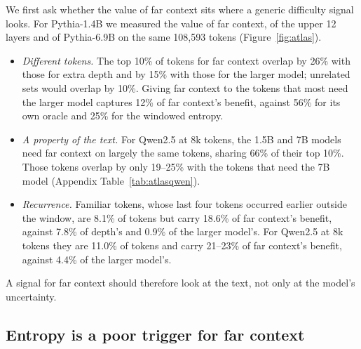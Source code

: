 \documentclass[11pt]{article}
\begin{document}
We first ask whether the value of far context sits where a generic difficulty signal looks. For Pythia-1.4B we measured the value of far context, of the upper 12 layers and of Pythia-6.9B on the same 108,593 tokens (Figure~\ref{fig:atlas}).
\begin{itemize}
\item \emph{Different tokens.} The top 10\% of tokens for far context overlap by 26\% with those for extra depth and by 15\% with those for the larger model; unrelated sets would overlap by 10\%. Giving far context to the tokens that most need the larger model captures 12\% of far context's benefit, against 56\% for its own oracle and 25\% for the windowed entropy.
\item \emph{A property of the text.} For Qwen2.5 at 8k tokens, the 1.5B and 7B models need far context on largely the same tokens, sharing 66\% of their top 10\%. Those tokens overlap by only 19--25\% with the tokens that need the 7B model (Appendix Table~\ref{tab:atlasqwen}).
\item \emph{Recurrence.} Familiar tokens, whose last four tokens occurred earlier outside the window, are 8.1\% of tokens but carry 18.6\% of far context's benefit, against 7.8\% of depth's and 0.9\% of the larger model's. For Qwen2.5 at 8k tokens they are 11.0\% of tokens and carry 21--23\% of far context's benefit, against 4.4\% of the larger model's.
\end{itemize}
A signal for far context should therefore look at the text, not only at the model's uncertainty.

\subsection{Entropy is a poor trigger for far context}\label{sec:e2e}

\begin{table}[t]
\centering
\small
\setlength{\tabcolsep}{3.4pt}
\caption{Per-token gating in frozen models: \% of the local$\to$full gap recovered when 10\% of queries per document may attend beyond the window (natural text, held-out documents). ``Gap'' is the local minus full loss in nats/token. ``Fam.\ head'': entropy and the six familiarity features only. Last column: value head over entropy, with a paired 95\% bootstrap interval. Budget curves are in Appendix Figure~\ref{fig:e2e}.}
\label{tab:e2e}
\end{table}
\end{document}
